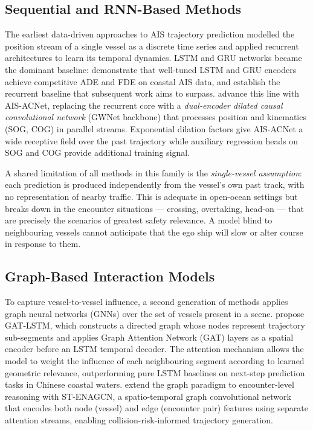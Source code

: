 \documentclass[12pt, a4paper]{article}
\begin{document}
  \subsection{Sequential and RNN-Based Methods}

  The earliest data-driven approaches to AIS trajectory prediction modelled
  the position stream of a single vessel as a discrete time series and applied
  recurrent architectures to learn its temporal dynamics.  LSTM and GRU networks
  became the dominant baseline: \citet{zhang2024lstmgru} demonstrate that
  well-tuned LSTM and GRU encoders achieve competitive ADE and FDE on coastal AIS
  data, and establish the recurrent baseline that subsequent work aims to surpass.
  \citet{shin2024aisacnet} advance this line with AIS-ACNet, replacing the recurrent
  core with a \emph{dual-encoder dilated causal convolutional network} (GWNet backbone)
  that processes position and kinematics (SOG, COG) in parallel streams.  Exponential
  dilation factors give AIS-ACNet a wide receptive field over the past trajectory
  while auxiliary regression heads on SOG and COG provide additional training signal.

  A shared limitation of all methods in this family is the \emph{single-vessel
  assumption}: each prediction is produced independently from the vessel's own
  past track, with no representation of nearby traffic.  This is adequate in
  open-ocean settings but breaks down in the encounter situations ---
  crossing, overtaking, head-on --- that are precisely the scenarios of greatest
  safety relevance.  A model blind to neighbouring vessels cannot anticipate that
  the ego ship will slow or alter course in response to them.

  \subsection{Graph-Based Interaction Models}

  To capture vessel-to-vessel influence, a second generation of methods applies
  graph neural networks (GNNs) over the set of vessels present in a scene.
  \citet{zhao2023gatlstm} propose GAT-LSTM, which constructs a directed graph
  whose nodes represent trajectory sub-segments and applies Graph Attention Network
  (GAT) layers as a spatial encoder before an LSTM temporal decoder.  The attention
  mechanism allows the model to weight the influence of each neighbouring segment
  according to learned geometric relevance, outperforming pure LSTM baselines on
  next-step prediction tasks in Chinese coastal waters.
  \citet{zeng2024stenagcn} extend the graph paradigm to encounter-level reasoning
  with ST-ENAGCN, a spatio-temporal graph convolutional network that encodes both
  node (vessel) and edge (encounter pair) features using separate attention streams,
  enabling collision-risk-informed trajectory generation.
\end{document}

